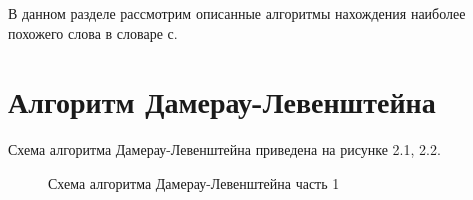 \documentclass[12pt,a4paper]{report}
\begin{document}
В данном разделе рассмотрим описанные алгоритмы нахождения наиболее похожего слова в словаре с.
\section{Алгоритм Дамерау-Левенштейна}
Схема алгоритма Дамерау-Левенштейна приведена на рисунке 2.1, 2.2.
\begin{figure}[H]
    \caption{Схема алгоритма Дамерау-Левенштейна часть 1}
    \label{fig:image}
\end{figure}
\end{document}
